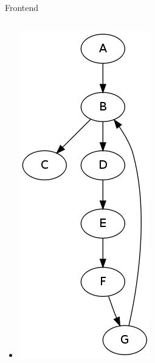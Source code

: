 \documentclass{beamer}
\begin{document}
\begin{frame}{Frontend}
\begin{columns}
\begin{column}{0.4\textwidth}
\begin{center}
\begin{itemize}
          \item<2->[] \includegraphics[scale=0.2]{controlflow.png}
        \end{itemize}
      \end{center}      
    \end{column}
  \end{columns}
\end{frame}
\end{document}
